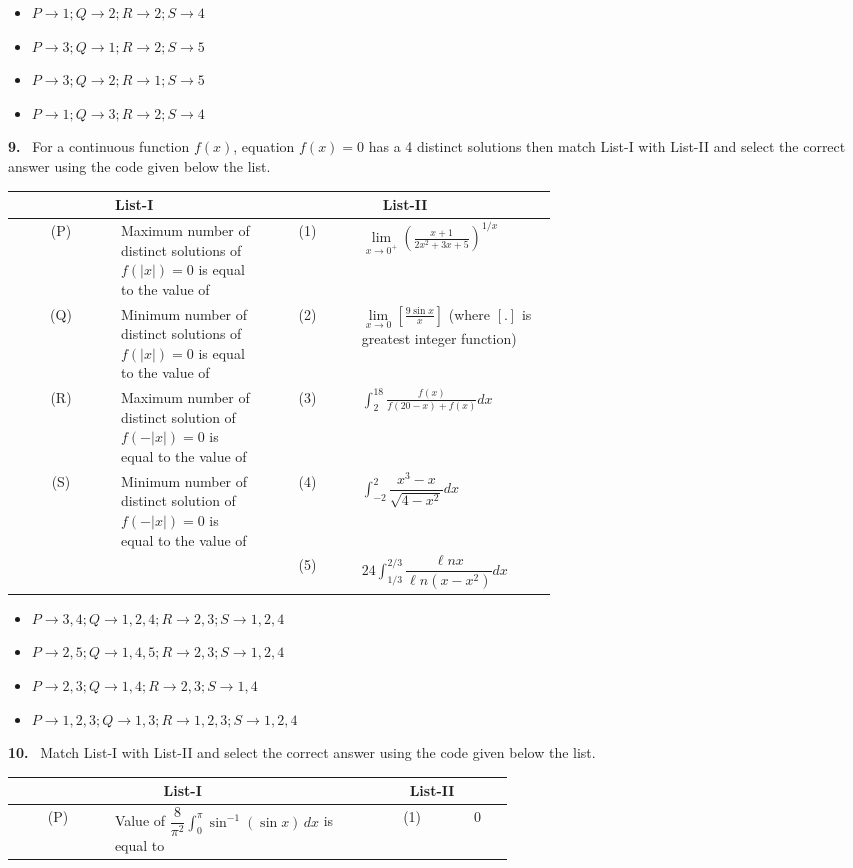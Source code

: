 \documentclass[10pt]{extarticle}
\newcommand{\qn}[1]{\par\smallskip\noindent\textbf{#1.}~}
\newenvironment{qoptions}{\begin{itemize}[leftmargin=1.8em,itemsep=1pt,topsep=2pt,label={}]}{\end{itemize}}
\newcommand{\opt}[2]{\item[(#1)] #2}
\begin{document}
\begin{multicols}{2}
\begin{qoptions}
\opt{A}{$P\to1;Q\to2;R\to2;S\to4$}
\opt{B}{$P\to3;Q\to1;R\to2;S\to5$}
\opt{C}{$P\to3;Q\to2;R\to1;S\to5$}
\opt{D}{$P\to1;Q\to3;R\to2;S\to4$}
\end{qoptions}
\qn{9} For a continuous function $f(x)$, equation $f(x)=0$ has a 4 distinct solutions then match List-I with List-II and select the correct answer using the code given below the list.\par
{\footnotesize\setlength{\tabcolsep}{2pt}\begin{tabular}{|c|p{0.27\linewidth}|c|p{0.36\linewidth}|}
\hline
\multicolumn{2}{|c|}{\textbf{List-I}} & \multicolumn{2}{c|}{\textbf{List-II}}\\ \hline
(P) & Maximum number of distinct solutions of $f(|x|)=0$ is equal to the value of & (1) & {\scriptsize$\lim\limits_{x\to0^+}\left(\frac{x+1}{2x^2+3x+5}\right)^{1/x}$}\\ \hline
(Q) & Minimum number of distinct solutions of $f(|x|)=0$ is equal to the value of & (2) & {\scriptsize$\lim\limits_{x\to0}\left[\frac{9\sin x}{x}\right]$ (where $[.]$ is greatest integer function)}\\ \hline
(R) & Maximum number of distinct solution of $f(-|x|)=0$ is equal to the value of & (3) & {\scriptsize$\displaystyle\int_2^{18}\frac{f(x)}{f(20-x)+f(x)}dx$}\\ \hline
(S) & Minimum number of distinct solution of $f(-|x|)=0$ is equal to the value of & (4) & {\small$\displaystyle\int_{-2}^{2}\dfrac{x^3-x}{\sqrt{4-x^2}}dx$}\\ \hline
 & & (5) & {\small$24\displaystyle\int_{1/3}^{2/3}\dfrac{\ell nx}{\ell n(x-x^2)}dx$}\\ \hline
\end{tabular}}\par
\begin{qoptions}
\opt{A}{$P\to3,4;Q\to1,2,4;R\to2,3;S\to1,2,4$}
\opt{B}{$P\to2,5;Q\to1,4,5;R\to2,3;S\to1,2,4$}
\opt{C}{$P\to2,3;Q\to1,4;R\to2,3;S\to1,4$}
\opt{D}{$P\to1,2,3;Q\to1,3;R\to1,2,3;S\to1,2,4$}
\end{qoptions}
\qn{10} Match List-I with List-II and select the correct answer using the code given below the list.\par
{\footnotesize\setlength{\tabcolsep}{2pt}\begin{tabular}{|c|p{0.5\linewidth}|c|p{0.08\linewidth}|}
\hline
\multicolumn{2}{|c|}{\textbf{List-I}} & \multicolumn{2}{c|}{\textbf{List-II}}\\ \hline
(P) & Value of $\dfrac8{\pi^2}\displaystyle\int_0^\pi\sin^{-1}(\sin x)\,dx$ is equal to & (1) & 0\\ \hline

\end{tabular}}
\end{multicols}
\end{document}
